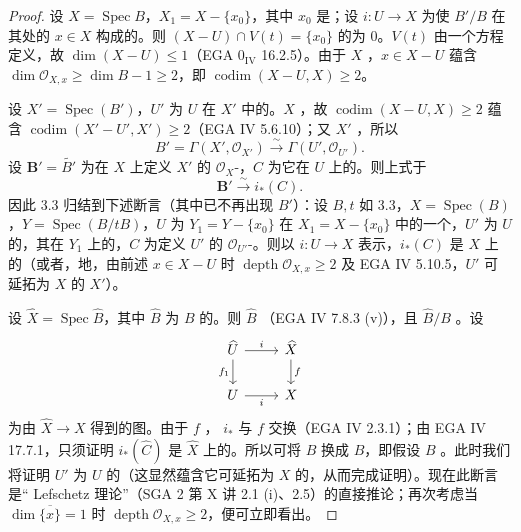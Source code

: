 \begin{proof}
设 $X=\operatorname{Spec}B$，$X_1=X-\{x_0\}$，其中 $x_0$ 是；设 $i:U\to X$ 为使 $B'/B$ 在其处的 $x\in X$ 构成的。则 $(X-U)\cap V(t)=\{x_0\}$ 的为 $0$。$V(t)$ 由一个方程定义，故 $\dim(X-U)\leq1$（EGA $0_{\mathrm{IV}}$ 16.2.5）。由于 $X$ ，$x\in X-U$ 蕴含 $\dim\mathscr O_{X,x}\geq\dim B-1\geq2$，即 $\operatorname{codim}(X-U,X)\geq2$。

设 $X'=\operatorname{Spec}(B')$，$U'$ 为 $U$ 在 $X'$ 中的。$X$ ，故 $\operatorname{codim}(X-U,X)\geq2$ 蕴含 $\operatorname{codim}(X'-U',X')\geq2$（EGA IV 5.6.10）；又 $X'$ ，所以
\[B'=\Gamma(X',\mathscr O_{X'})\xrightarrow{\sim}\Gamma(U',\mathscr O_{U'}).\]
设 $\mathbf B'=\widetilde{B'}$ 为在 $X$ 上定义 $X'$ 的 $\mathscr O_X$-，$C$ 为它在 $U$ 上的。则上式于
\[\mathbf B'\xrightarrow{\sim}i_*(C).\]
因此 3.3 归结到下述断言（其中已不再出现 $B'$）：设 $B,t$ 如 3.3，$X=\operatorname{Spec}(B)$，$Y=\operatorname{Spec}(B/tB)$，$U$ 为 $Y_1=Y-\{x_0\}$ 在 $X_1=X-\{x_0\}$ 中的一个，$U'$ 为 $U$ 的，其在 $Y_1$ 上的，$C$ 为定义 $U'$ 的 $\mathscr O_{U'}$-。则以 $i:U\to X$ 表示，$i_*(C)$ 是 $X$ 上的（或者，地，由前述 $x\in X-U$ 时 $\operatorname{depth}\mathscr O_{X,x}\geq2$ 及 EGA IV 5.10.5，$U'$ 可延拓为 $X$ 的 $X'$）。

设 $\widehat X=\operatorname{Spec}\widehat B$，其中 $\widehat B$ 为 $B$ 的。则 $\widehat B$ （EGA IV 7.8.3 (v)），且 $\widehat B/B$ 。设
\[
\begin{tikzcd}
\widehat U\arrow[r,"i"]\arrow[d,"f_1"']&\widehat X\arrow[d,"f"]\\
U\arrow[r,"i"']&X
\end{tikzcd}
\]
为由 $\widehat X\to X$ 得到的图。由于 $f$ ， $i_*$ 与 $f$ 交换（EGA IV 2.3.1）；由 EGA IV 17.7.1，只须证明 $i_*(\widehat C)$ 是 $\widehat X$ 上的。所以可将 $B$ 换成 $\widehat B$，即假设 $B$ 。此时我们将证明 $U'$ 为 $U$ 的（这显然蕴含它可延拓为 $X$ 的，从而完成证明）。现在此断言是“ Lefschetz 理论”（SGA 2 第 X 讲 2.1 (i)、2.5）的直接推论；再次考虑当 $\dim\overline{\{x\}}=1$ 时 $\operatorname{depth}\mathscr O_{X,x}\geq2$，便可立即看出。
\end{proof}
